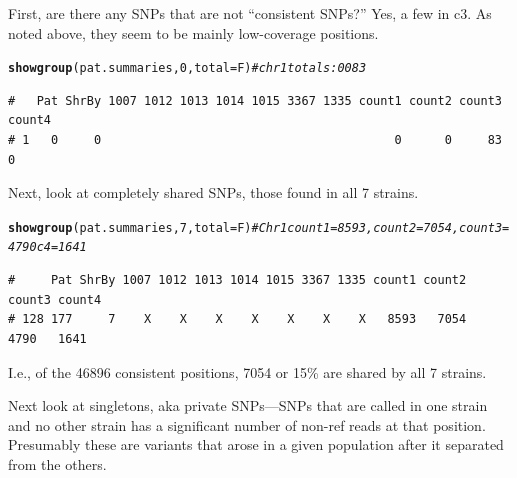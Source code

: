 \documentclass{article}\usepackage[]{graphicx}\usepackage[]{color}
\makeatletter
\newcommand{\hlnum}[1]{\textcolor[rgb]{0.686,0.059,0.569}{#1}}%
\newcommand{\hlcom}[1]{\textcolor[rgb]{0.678,0.584,0.686}{\textit{#1}}}%
\newcommand{\hlstd}[1]{\textcolor[rgb]{0.345,0.345,0.345}{#1}}%
\newcommand{\hlkwc}[1]{\textcolor[rgb]{0.333,0.667,0.333}{#1}}%
\newcommand{\hlkwd}[1]{\textcolor[rgb]{0.737,0.353,0.396}{\textbf{#1}}}%
\newenvironment{kframe}{%
 \def\at@end@of@kframe{}%
 \ifinner\ifhmode%
  \def\at@end@of@kframe{\end{minipage}}%
  \begin{minipage}{\columnwidth}%
 \fi\fi%
 \def\FrameCommand##1{\hskip\@totalleftmargin \hskip-\fboxsep
 \colorbox{shadecolor}{##1}\hskip-\fboxsep
     \hskip-\linewidth \hskip-\@totalleftmargin \hskip\columnwidth}%
 \MakeFramed {\advance\hsize-\width
   \@totalleftmargin\z@ \linewidth\hsize
   \@setminipage}}%
 {\par\unskip\endMakeFramed%
 \at@end@of@kframe}
\newenvironment{knitrout}{}{} %
\makeatother
\begin{document}
First, are there any SNPs that are not ``consistent SNPs?''  Yes, a few in c3.  As noted above, they seem to be mainly
low-coverage positions.

\begin{knitrout}\footnotesize
{}\color{fgcolor}\begin{kframe}
\begin{alltt}
\hlkwd{showgroup}\hlstd{(pat.summaries,}\hlnum{0}\hlstd{,}\hlkwc{total}\hlstd{=F)}  \hlcom{# chr1 totals: 0 0 83}
\end{alltt}
\begin{verbatim}
#   Pat ShrBy 1007 1012 1013 1014 1015 3367 1335 count1 count2 count3 count4
# 1   0     0                                         0      0     83      0
\end{verbatim}
\end{kframe}
\end{knitrout}

Next, look at completely shared SNPs, those found in all 7 strains.

\begin{knitrout}\footnotesize
{}\color{fgcolor}\begin{kframe}
\begin{alltt}
\hlkwd{showgroup}\hlstd{(pat.summaries,}\hlnum{7}\hlstd{,}\hlkwc{total}\hlstd{=F)} \hlcom{# Chr1 count1 = 8593, count2 = 7054, count3 = 4790 c4=1641}
\end{alltt}
\begin{verbatim}
#     Pat ShrBy 1007 1012 1013 1014 1015 3367 1335 count1 count2 count3 count4
# 128 177     7    X    X    X    X    X    X    X   8593   7054   4790   1641
\end{verbatim}
\end{kframe}
\end{knitrout}

I.e., of the
  46896
consistent positions,
  7054
or
  15\%
are shared by all 7 strains.

Next look at singletons, aka private SNPs---SNPs that are called in one strain and no other strain has a significant
number of non-ref reads at that position. Presumably these are variants that arose in a given population after it
separated from the others.
\end{document}
